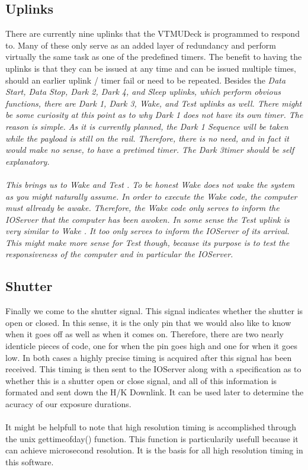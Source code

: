 \subsection{Uplinks}
There are currently nine uplinks that the VTMUDeck is programmed to respond to. Many of these
only serve as an added layer of redundancy and perform virtually the same task as one of the
predefined timers. The benefit to having the uplinks is that they can be issued at any time and 
can be issued multiple times, should an earlier uplink / timer fail or need to be repeated. Besides
the \it Data Start, Data Stop, Dark 2, Dark 4, \rm and \it Sleep \rm uplinks, which perform obvious
functions, there are \it Dark 1, Dark 3, Wake, \rm and \it Test \rm uplinks as well. There might 
be some curiosity at this point as to why \it Dark 1 \rm does not have its own timer. The reason
is simple. As it is currently planned, the Dark 1 Sequence will be taken while the payload is still
on the rail. Therefore, there is no need, and in fact it would make no sense, to have a pretimed timer.
The \it Dark 3\rm timer should be self explanatory.
\\
\\
This brings us to \it Wake \rm and \it Test \rm. To be honest \it Wake \rm does not wake the system as you might
naturally assume. In order to execute the \it Wake \rm code, the computer must allready be awake. Therefore,
the \it Wake \rm code only serves to inform the IOServer that the computer has been awoken. In some sense the 
\it Test \rm uplink is very similar to \it Wake \rm. It too only serves to inform the IOServer of its arrival. This
might make more sense for \it Test \rm though, because its purpose is to test the responsiveness of the computer and
in particular the IOServer.

\subsection{Shutter}

Finally we come to the shutter signal. This signal indicates whether the shutter is open or closed. In this sense,
it is the only pin that we would also like to know when it goes off as well as when it comes on. Therefore, there are two
nearly identicle pieces of code, one for when the pin goes high and one for when it goes low. In both cases a highly 
precise timing is acquired after this signal has been received. This timing is then sent to the IOServer along with 
a specification 
as to whether this is a shutter open or close signal, and all of this information is formated and sent down the H/K Downlink.
It can be used later to determine the acuracy of our exposure durations.
\\
\\
It might be helpfull to note that high resolution timing is accomplished through the unix gettimeofday() function. This
function is particularily usefull because it can achieve microsecond resolution. It is the basis for all high resolution
timing in this software.

%

